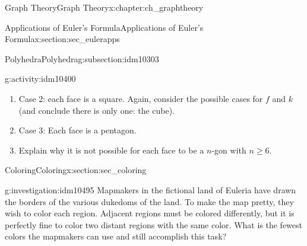 \documentclass[oneside,10pt,]{book}
\numberwithin{equation}{chapter}
\begin{document}
\begin{chapterptx}{Graph Theory}{}{Graph Theory}{}{}{x:chapter:ch_graphtheory}
\begin{sectionptx}{Applications of Euler's Formula}{}{Applications of Euler's Formula}{}{}{x:section:sec_eulerapps}
\begin{subsectionptx}{Polyhedra}{}{Polyhedra}{}{}{g:subsection:idm10303}
\begin{activity}{}{g:activity:idm10400}
\begin{enumerate}[font=\bfseries,label=(\alph*),ref=\alph*]
\item{}Case 2: each face is a square.  Again, consider the possible cases for \(f\) and \(k\) (and conclude there is only one: the cube).%
\item{}Case 3: Each face is a pentagon.%
\item{}Explain why it is not possible for each face to be a \(n\)-gon with \(n \ge 6\).%
\end{enumerate}
\end{activity}
%
\end{subsectionptx}
\end{sectionptx}
%
%
\typeout{************************************************}
\typeout{************************************************}
%
\begin{sectionptx}{Coloring}{}{Coloring}{}{}{x:section:sec_coloring}
\begin{introduction}{}%
\begin{investigation}{}{g:investigation:idm10495}%
Mapmakers in the fictional land of Euleria have drawn the borders of the various dukedoms of the land. To make the map pretty, they wish to color each region. Adjacent regions must be colored differently, but it is perfectly fine to color two distant regions with the same color. What is the fewest colors the mapmakers can use and still accomplish this task?%
\begin{sidebyside}{1}{0.25}{0.25}{0}%
\begin{sbspanel}{0.5}%
\end{sbspanel}
\end{sidebyside}
\end{investigation}
\end{introduction}
\end{sectionptx}
\end{chapterptx}
\end{document}
